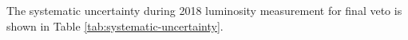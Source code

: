 




The systematic uncertainty during 2018 luminosity measurement for final veto is shown in Table \ref{tab:systematic-uncertainty}.  

